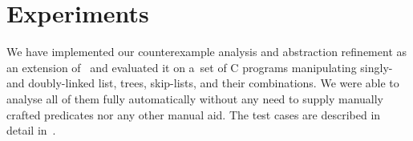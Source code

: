 {%




\section{Experiments}\label{sec:exps}

We have implemented our counterexample analysis and abstraction refinement as an
extension of~\forester{} and evaluated it on a~set of C programs manipulating
singly- and doubly-linked list, trees, skip-lists, and their combinations. We
were able to analyse all of them fully automatically without any need to supply
manually crafted predicates nor any other manual aid. The test cases are described in
detail in~\cite{forester17techrep}.



}
